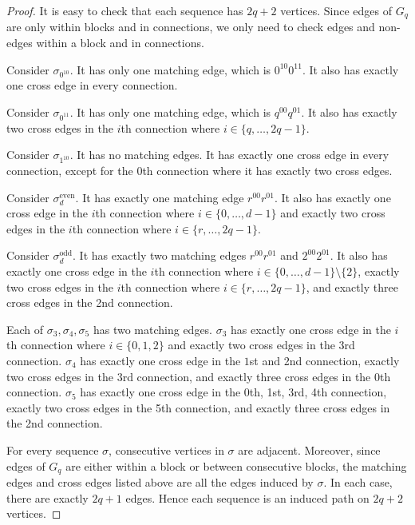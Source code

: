 \documentclass[10pt,a4paper]{amsart}
\begin{document}
\begin{proof}
It is easy to check that each sequence has $2q+2$ vertices.
Since edges of $G_q$ are only within blocks and in connections, we only need to check edges and non-edges within a block and in connections. 

Consider $\sigma_{0^{10}}$.
It has only one matching edge, which is $0^{10}0^{11}$.
It also has exactly one cross edge in every connection. 

Consider $\sigma_{0^{11}}$.
It has only one matching edge, which is $q^{00}q^{01}$.  
It also has exactly two cross edges in the $i$th connection where $i\in\{q, \ldots, 2q-1\}$. 

Consider $\sigma_{1^{10}}$.
It has no matching edges. 
It has exactly one cross edge in every connection, except for the $0$th connection where it has exactly two cross edges. 

Consider  $\sigma_d^{\mathrm{even}}$.
It has exactly one matching edge $r^{00}r^{01}$. 
It also has exactly one cross edge in the $i$th connection where $i\in\{0, \ldots, d-1\}$ and exactly two cross edges in the $i$th connection where $i\in\{r, \ldots, 2q-1\}$. 

Consider  $\sigma_d^{\mathrm{odd}}$.
It has exactly two matching edges $r^{00}r^{01}$ and $2^{00}2^{01}$. 
It also has exactly one cross edge in the $i$th connection where $i\in\{0, \ldots, d-1\}\setminus\{2\}$, exactly two cross edges in the $i$th connection where $i\in\{r, \ldots, 2q-1\}$, and exactly three cross edges in the 2nd connection. 

Each of $\sigma_3, \sigma_4, \sigma_5$ has two matching edges. 
$\sigma_3$ has exactly one cross edge in the $i$th connection where $i\in\{0,1, 2\}$ and exactly two cross edges in the 3rd connection. 
$\sigma_4$ has exactly one cross edge in the $1$st and 2nd connection, exactly two cross edges in the 3rd connection, and exactly three cross edges in the 0th connection. 
$\sigma_5$ has exactly one cross edge in the $0$th, 1st, 3rd, 4th connection, exactly two cross edges in the 5th connection, and exactly three cross edges in the 2nd connection. 

For every sequence $\sigma$, consecutive vertices in $\sigma$ are adjacent.
Moreover, since edges of $G_q$ are either  within a block or between consecutive blocks, the matching edges and cross edges listed above are all the edges induced by $\sigma$.
In each case, there are exactly  $2q+1$ edges.
Hence each sequence is an induced path on $2q+2$ vertices.
\end{proof}
\end{document}
